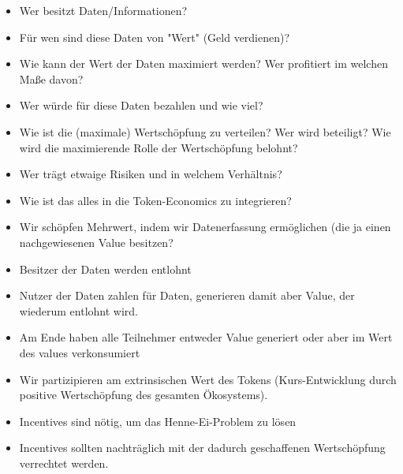 \begin{Praemisse}

\vspace{0.2cm}


\vspace{0.2cm}

\begin{itemize}
  \item Wer besitzt Daten/Informationen?
  \item Für wen sind diese Daten von "Wert" (Geld verdienen)?
  \item Wie kann der Wert der Daten maximiert werden? Wer profitiert im welchen Maße davon?
  \item Wer würde für diese Daten bezahlen und wie viel?
  \item Wie ist die (maximale) Wertschöpfung zu verteilen? Wer wird beteiligt? Wie wird die maximierende Rolle der Wertschöpfung belohnt?
  \item Wer trägt etwaige Risiken und in welchem Verhältnis?
  \item Wie ist das alles in die Token-Economics zu integrieren? 
\end{itemize}

\end{Praemisse}


\vspace{0.3cm}

\begin{Fazit}

\begin{itemize}
  \item Wir schöpfen Mehrwert, indem wir Datenerfassung ermöglichen (die ja einen nachgewiesenen Value besitzen?
  \item Besitzer der Daten werden entlohnt
  \item Nutzer der Daten zahlen für Daten, generieren damit aber Value, der wiederum entlohnt wird.
  \item Am Ende haben alle Teilnehmer entweder Value generiert oder aber im Wert des values verkonsumiert
  \item Wir partizipieren am extrinsischen Wert des Tokens (Kurs-Entwicklung durch positive Wertschöpfung des gesamten Ökosystems).
  \item Incentives sind nötig, um das Henne-Ei-Problem zu lösen
  \item Incentives sollten nachträglich mit der dadurch geschaffenen Wertschöpfung verrechtet werden. 
\end{itemize}

\end{Fazit}


